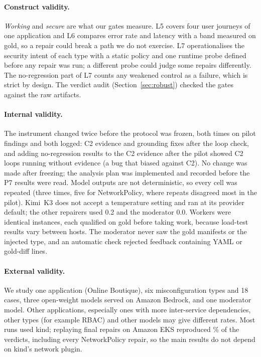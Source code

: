 \documentclass[10pt]{article}
\begin{document}
\paragraph{Construct validity.} \emph{Working} and \emph{secure} are what our gates measure. L5 covers four user
journeys of one application and L6 compares error rate and latency with a band measured on gold, so a repair could
break a path we do not exercise. L7 operationalises the security intent of each type with a static policy and one
runtime probe defined before any repair was run; a different probe could judge some repairs differently. The
no-regression part of L7 counts any weakened control as a failure, which is strict by design. The verdict audit
(Section~\ref{sec:robust}) checked the gates against the raw artifacts.

\paragraph{Internal validity.} The instrument changed twice before the protocol was frozen, both times on pilot findings
and both logged: C2 evidence and grounding fixes after the loop check, and adding no-regression results to the C2
evidence after the pilot showed C2 loops running without evidence (a bug that biased against C2). No change was made
after freezing; the analysis plan was implemented and recorded before the P7 results were read. Model outputs are not
deterministic, so every cell was repeated (three times, five for NetworkPolicy, where repeats disagreed most in the
pilot). Kimi~K3 does not accept a temperature setting and ran at its provider default; the other repairers used 0.2
and the moderator 0.0. Workers were identical instances, each qualified on gold before taking work, because load-test
results vary between hosts. The moderator never saw the gold manifests or the injected type, and an automatic check
rejected feedback containing YAML or gold-diff lines.

\paragraph{External validity.} We study one application (Online Boutique), six misconfiguration types and 18 cases,
three open-weight models served on Amazon Bedrock, and one moderator model. Other applications, especially ones with
more inter-service dependencies, other types (for example RBAC) and other models may give different rates. Most runs
used kind; replaying \PeightAgreeN{} final repairs on Amazon EKS reproduced \PeightAgreePct\% of the verdicts, including
every NetworkPolicy repair, so the main results do not depend on kind's network plugin.
\end{document}
